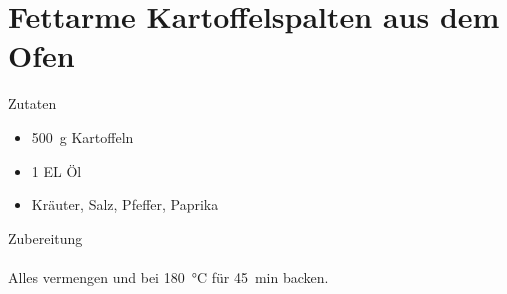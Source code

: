 \section*{Fettarme Kartoffelspalten aus dem Ofen}
\ihead{}\ohead{}
\cfoot{}
{\Large Zutaten}
\begin{itemize}
    \item \SI{500}{g} Kartoffeln
    \item \num{1} EL Öl
    \item Kräuter, Salz, Pfeffer, Paprika
\end{itemize}
\noindent
{\Large Zubereitung}\\
\\
Alles vermengen und bei \SI{180}{\celsius} für \SI{45}{min} backen.
